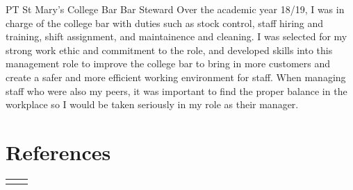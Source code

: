 \documentclass[10pt]{article} %
\begin{document}
\begin{paracol}{2}
{PT} %
{St Mary's College Bar} %
{Bar Steward} %
{Over the academic year 18/19, I was in charge of the college bar with duties such as stock control, staff hiring and training, shift assignment, and maintainence and cleaning. I was selected for my strong work ethic and commitment to the role, and developed skills into this management role to improve the college bar to bring in more customers and create a safer and more efficient working environment for staff. When managing staff who were also my peers, it was important to find the proper balance in the workplace so I would be taken seriously in my role as their manager.} %



\section{References}







\begin{supertabular}{rl} %
	
	


\end{supertabular}
\end{paracol}
\end{document}
